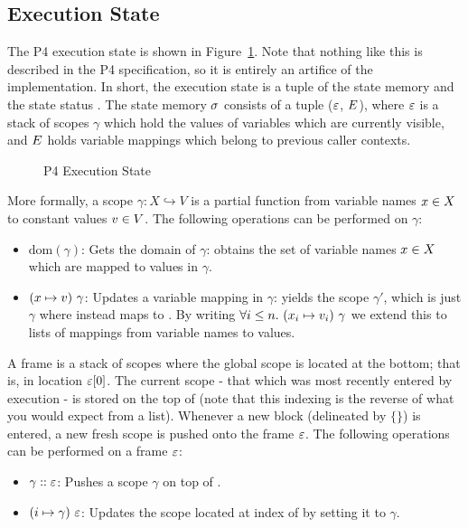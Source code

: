 \documentclass[UTF8]{article}
\begin{document}
\subsection{Execution State}

The P4 execution state is shown in Figure~\ref{fig:status}. Note that nothing like this is described in the P4 specification, so it is entirely an artifice of the \pfott{} implementation. In short, the execution state \exstate{} is a tuple of the state memory \stacks{} and the state status \status{}. The state memory $\sigma{}$ consists of a tuple ($\varepsilon$, $E$), where $\varepsilon$ is a stack of scopes $\gamma$ which hold the values of variables which are currently visible, and $E$ holds variable mappings which belong to previous caller contexts.

\begin{figure}[h!]
\centering\ottgrammartabular{
\ottstatus\ottinterrule
\ottstate\ottafterlastrule
}
\caption{P4 Execution State}
\label{fig:status}
\end{figure}

More formally, a scope $\gamma : X \hookrightarrow V$ is a partial function from variable names $x{} \in X$ to constant values $v{} \in V$. The following operations can be performed on $\gamma$:
\begin{itemize}
\item $\mathrm{dom} ( \gamma )$: Gets the domain of $\gamma$: obtains the set of variable names $x{} \in X$ which are mapped to values in $\gamma$.
\item $(x \mapsto  v) \,\, \gamma$: Updates a variable mapping in $\gamma$: yields the scope $\gamma'$, which is just $\gamma$ where \vn{} instead maps to \cval{}. By writing $\forall i \leq n. \,\, ({x}_i \mapsto  {\ensuremath{v}}_i) \,\, \gamma$ we extend this to lists of mappings from variable names to values.
\end{itemize}

A frame \currsf{} is a stack of scopes where the global scope \gscope{} is located at the bottom; that is, in location $\varepsilon [0]$. The current scope - that which was most recently entered by execution - is stored on the top of \currsf{}  (note that this indexing is the reverse of what you would expect from a list). Whenever a new block (delineated by $\{ \}$) is entered, a new fresh scope \escope{} is pushed onto the frame $\varepsilon$. %
The following operations can be performed on a frame $\varepsilon$:
\begin{itemize}
\item $ \gamma :: \varepsilon$: Pushes a scope $\gamma$ on top of \currsf{}.
\item $(i \mapsto  \gamma) \,\, \varepsilon$: Updates the scope located at index \num{} of \currsf{} by setting it to $\gamma$.
\end{itemize}
\end{document}
